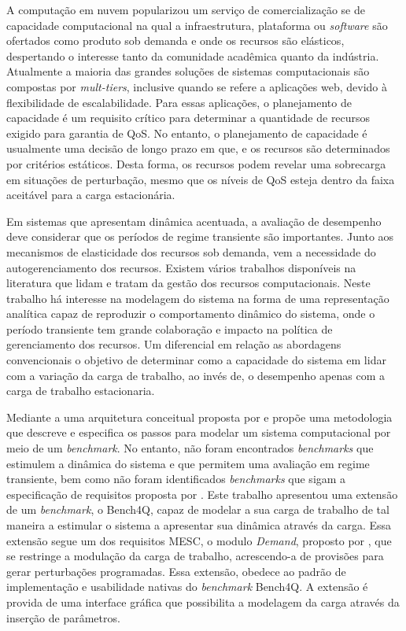 A computação em nuvem popularizou um serviço de comercialização se de capacidade computacional na qual a infraestrutura, plataforma ou \textit{software} são ofertados como produto sob demanda e onde os recursos são elásticos, despertando o interesse tanto da comunidade acadêmica quanto da indústria. Atualmente a maioria das grandes soluções de sistemas computacionais são compostas por \textit{mult-tiers}, inclusive quando se refere a aplicações web, devido à flexibilidade de escalabilidade. Para essas aplicações, o planejamento de capacidade é um requisito crítico para determinar a quantidade de recursos exigido para garantia de QoS. No entanto, o planejamento de capacidade é usualmente uma decisão de longo prazo em que, e os recursos são determinados por critérios estáticos. Desta forma, os recursos podem revelar uma sobrecarga em situações de perturbação, mesmo que os níveis de QoS esteja dentro da faixa aceitável para a carga estacionária. %

Em sistemas que apresentam dinâmica acentuada, a avaliação de desempenho deve considerar que os períodos de regime transiente são importantes. Junto aos mecanismos de elasticidade dos recursos sob demanda, vem a necessidade do autogerenciamento dos recursos. Existem vários trabalhos disponíveis na literatura que lidam e tratam da gestão dos recursos computacionais. Neste trabalho há interesse na modelagem do sistema na forma de uma representação analítica capaz de reproduzir o comportamento dinâmico do sistema, onde o período transiente tem grande colaboração e impacto na política de gerenciamento dos recursos. Um diferencial em relação as abordagens convencionais o objetivo de determinar como a capacidade do sistema em lidar com a variação da carga de trabalho, ao invés de, o desempenho apenas com a carga de trabalho estacionaria.

Mediante a uma arquitetura conceitual proposta por  e  propõe uma metodologia que descreve e especifica os passos para modelar um sistema computacional por meio de um \textit{benchmark}. No entanto, não foram encontrados \textit{benchmarks} que estimulem a dinâmica do sistema e que permitem uma avaliação em regime transiente, bem como não foram identificados \textit{benchmarks} que sigam a especificação de requisitos proposta por .
Este trabalho apresentou uma extensão de um \textit{benchmark}, o Bench4Q, capaz de modelar a sua carga de trabalho de tal maneira a estimular o sistema a apresentar sua dinâmica através da carga. Essa extensão segue um dos requisitos MESC, o modulo \textit{Demand}, proposto por , que se restringe a modulação da carga de trabalho, acrescendo-a de provisões para gerar perturbações programadas. Essa extensão, obedece ao padrão de implementação e usabilidade nativas do \textit{benchmark} Bench4Q. A extensão é provida de uma interface gráfica que possibilita a modelagem da carga através da inserção de parâmetros.

